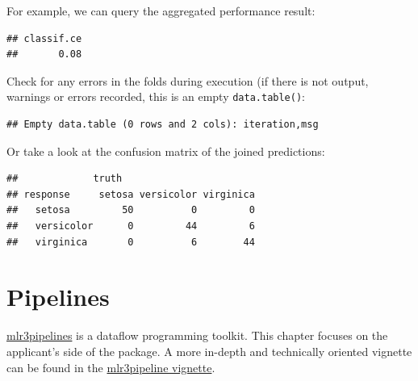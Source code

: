 \documentclass[]{scrbook}
\newenvironment{Shaded}{\begin{snugshade}}{\end{snugshade}}
\newcommand{\KeywordTok}[1]{\textcolor[rgb]{0.13,0.29,0.53}{\textbf{#1}}}
\newcommand{\NormalTok}[1]{#1}
\newcommand{\OperatorTok}[1]{\textcolor[rgb]{0.81,0.36,0.00}{\textbf{#1}}}
\renewenvironment{Shaded} {\begin{snugshade}\small} {\end{snugshade}}
\begin{document}
For example, we can query the aggregated performance result:

\begin{Shaded}
\end{Shaded}

\begin{verbatim}
## classif.ce 
##       0.08
\end{verbatim}

Check for any errors in the folds during execution (if there is not output, warnings or errors recorded, this is an empty \texttt{data.table()}:

\begin{Shaded}
\end{Shaded}

\begin{verbatim}
## Empty data.table (0 rows and 2 cols): iteration,msg
\end{verbatim}

Or take a look at the confusion matrix of the joined predictions:

\begin{Shaded}
\end{Shaded}

\begin{verbatim}
##             truth
## response     setosa versicolor virginica
##   setosa         50          0         0
##   versicolor      0         44         6
##   virginica       0          6        44
\end{verbatim}

\hypertarget{pipelines}{%
\chapter{Pipelines}\label{pipelines}}

\href{https://mlr3pipelines.mlr-org.com}{mlr3pipelines} is a dataflow programming toolkit.
This chapter focuses on the applicant's side of the package.
A more in-depth and technically oriented vignette can be found in the \href{https://mlr3pipelines.mlr-org.com/articles/introduction.html}{mlr3pipeline vignette}.
\end{document}
